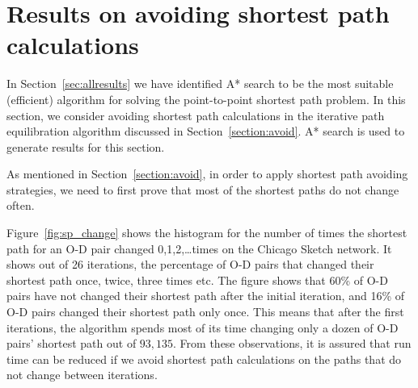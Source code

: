 \section{Results on avoiding shortest path calculations}
In Section~\ref{sec:allresults} we have identified A* search to be the most suitable (efficient) algorithm for solving the point-to-point shortest path problem.
In this section, we consider avoiding shortest path calculations in the iterative path equilibration algorithm discussed in Section~\ref{section:avoid}.
A* search is used to generate results for this section.

As mentioned in Section~\ref{section:avoid},
in order to apply shortest path avoiding strategies,
we need to first prove that most of the shortest paths do not change often.

Figure~\ref{fig:sp_change} shows 
the histogram for the number of times the shortest path for an O-D pair changed 0,1,2,\ldots times on the Chicago Sketch network.
It shows out of 26 iterations,
the percentage of O-D pairs that changed their shortest path once, twice, three times etc.
The figure shows that 60\% of O-D pairs have not changed their shortest path after the initial iteration,
and 16\% of O-D pairs changed their shortest path only once.
This means that after the first iterations,
the algorithm spends most of its time changing only a dozen of O-D pairs' shortest path out of $93{,}135$.
From these observations,
it is assured that run time can be reduced if we avoid shortest path calculations on the paths that do not change between iterations.

